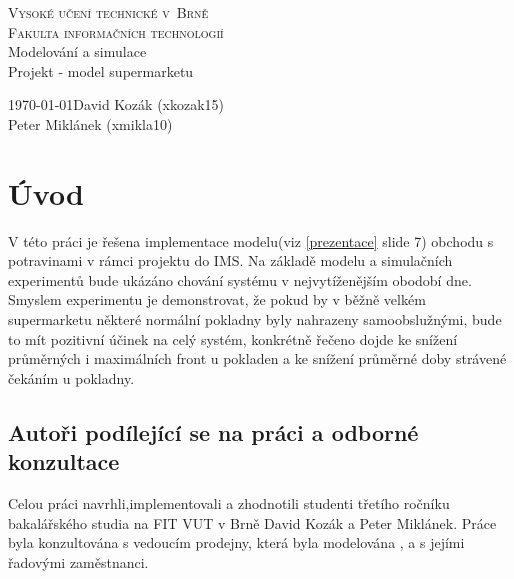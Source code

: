 \documentclass[12pt,a4paper,titlepage]{article}
\begin{document}
\begin{titlepage}
\begin{center}
    {
    	\Huge\textsc{Vysoké učení technické v~Brně}}\\
    \smallskip
    {
    	\huge\textsc{Fakulta informačních technologií}}\\
    \bigskip
    \huge{Modelování a simulace}\\
    \smallskip
    \Huge{Projekt - model supermarketu}\\
\end{center}
    {\Large \today \hfill David Kozák (xkozak15)  }\\
    \smallskip
    {\Large \hfill Peter Miklánek (xmikla10)}
\end{titlepage}

\newpage
\tableofcontents
\newpage

\section{Úvod}
V této práci je řešena implementace modelu(viz \ref{prezentace} slide 7) obchodu s potravinami v rámci projektu do IMS.
Na základě modelu a simulačních experimentů bude ukázáno chování systému v nejvytíženějším obodobí dne. Smyslem experimentu je demonstrovat, že pokud by v běžně velkém supermarketu některé normální pokladny byly nahrazeny samoobslužnými, bude to mít pozitivní účinek na celý systém, konkrétně řečeno dojde ke snížení průměrných i maximálních front u pokladen a ke snížení průměrné doby strávené čekáním u pokladny.
\subsection{Autoři podílející se na práci a odborné konzultace}
Celou práci navrhli,implementovali a zhodnotili studenti třetího ročníku bakalářského studia na FIT VUT v Brně David Kozák a Peter Miklánek. Práce byla konzultována s vedoucím prodejny, která byla modelována , a s jejími řadovými zaměstnanci. 
\end{document}
